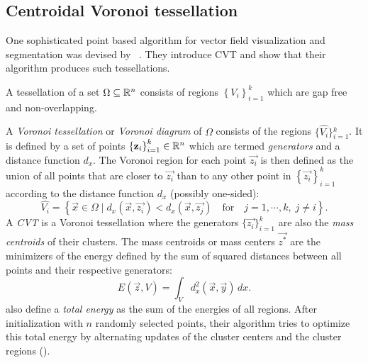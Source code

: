 \subsection{Centroidal Voronoi tessellation} 
\label{sec:related:CVT}
One sophisticated point based \kMeans algorithm for vector field visualization and segmentation was devised by ~\cite{DuWang}. They introduce \ac{CVT} and show that their \kMeans algorithm produces such tessellations.

 A tessellation of a set $\Omega \subseteq \mathbb{R}^n$ consists of regions $\left\{V_i\right\}_{i=1}^k$ which are gap free and non-overlapping.

A \emph{Voronoi tessellation} or \emph{Voronoi diagram} of $\Omega$ consists of the regions $\{\widehat{V_i}\}{}_{i=1}^k$. It is defined by a set of points $\left\{{\mathbf z_i}\right\}_{i=1}^k \in \mathbb{R}^n$ which are termed \emph{generators} and a distance function $d_x$.
The Voronoi region for each point $\vec{z_i}$ is then defined as the union of all points that are closer to $\vec{z_i}$ than to any other point in $\left\{\vec{z_i}\right\}_{i=1}^k$ according to the distance function $d_x$ (possibly one-sided):
%
\begin{equation}
  \widehat{V_i} = \left\{\vec{x} \in \Omega \mid d_x(\vec{x}, \vec{z_i}) < 
                  d_x(\vec{x}, \vec{z_j}) 
                  \quad \text{for} \quad j=1,\cdots,k, \; j \neq i\right\}.
\end{equation}
%
A \emph{\acl{CVT}} is a Voronoi tessellation where the generators $\{\vec{z_i}\}_{i=1}^k$ are also the \emph{mass centroids} of their clusters. The mass centroids or mass centers $\vec{z^*}$ are the minimizers of the energy defined by the sum of squared distances between all points and their respective generators:
%
\begin{equation}
  E(\vec{z},V) = \int_V{d_x^2(\vec{x},\vec{y})\,dx}.
\end{equation}
%
 also define a \emph{total energy} as the sum of the energies of all regions. After initialization with $n$ randomly selected points, their algorithm tries to optimize this total energy by alternating updates of the cluster centers and the cluster regions (\kMeans).

